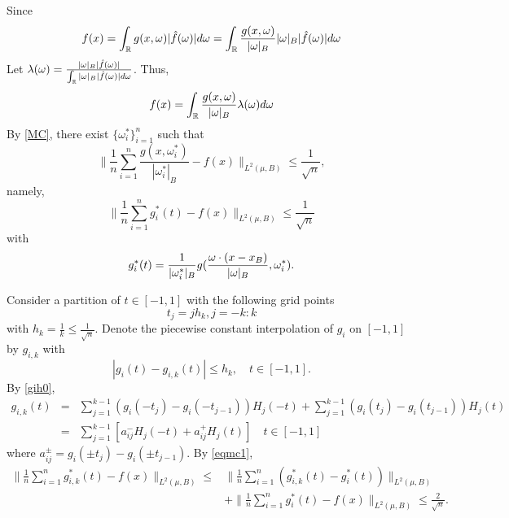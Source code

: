 
Since 
$$
f(x)=\int_{\mathbb R} g(x,\omega)|\hat f(\omega)|d\omega = \int_{\mathbb R} {g(x,\omega)\over |\omega|_B} |\omega|_B|\hat f(\omega)|d\omega
$$
Let $\lambda(\omega) = {|\omega|_B|\hat f(\omega)|\over \int_{\mathbb R} |\omega|_B|\hat f(\omega)|d\omega}$. Thus,
$$
f(x)=\int_{\mathbb R} {g(x,\omega)\over |\omega|_B}\lambda(\omega)d\omega
$$
By \eqref{MC}, there exist $\{\omega_i^\ast\}_{i=1}^n$ such that
$$
	\|\frac1n \sum_{i=1}^n \frac{g(x,\omega_i^\ast)}{|\omega_i^\ast|_B}-f(x)\|_{L^2(\mu,B)}\le \frac{1}{\sqrt{n}},
$$
namely,
\begin{equation}\label{eqmc1}
	\|\frac1n \sum_{i=1}^n g_i^\ast (t)-f(x)\|_{L^2(\mu,B)}\le \frac{1}{\sqrt{n}}
\end{equation}
with 
$$\displaystyle g_i^\ast (t)=\frac{1}{|\omega_i^\ast |_B}g({\omega\cdot (x-x_B)\over |\omega|_B},\omega_i^\ast).
$$


Consider a partition of $t\in [-1,1]$ with the following grid points
$$
t_j=jh_k, j=-k:k
$$
with 
$
h_k=\frac{1}{k}\le \frac{1}{\sqrt{n}}.
$
Denote the piecewise constant interpolation of $g_i$ on $[-1,1]$ by $g_{i,k}$ with
\begin{equation}\label{pro:intererror}
	|g_i(t)-g_{i,k}(t)|\le h_k, \quad t\in [-1,1].
\end{equation} 
By \eqref{gih0},
\begin{eqnarray}
	g_{i,k}(t)&=&
	\sum_{j=1}^{k-1}(g_i(-t_j) - g_i(-t_{j-1}))H_j(-t)+\sum_{j=1}^{k-1}(g_i(t_j) - g_i(t_{j-1})) H_{j}(t)\nonumber \\ 
	&=&\sum_{j=1}^{k-1}[a_{ij}^-H_j(-t)+a_{ij}^+H_{j}(t)] \label{gih}
	\quad t\in [-1,1]
\end{eqnarray}
where 
$
a_{ij}^{\pm}=g_i(\pm t_j) - g_i(\pm t_{j-1}).
$ 
By \eqref{eqmc1},
\begin{equation} \label{eq:gast}
\begin{split}
	\|\frac1n  \sum_{i=1}^n g_{i,k}^\ast(t)-f(x)\|_{L^2(\mu,B)}\le &
	\|\frac1n  \sum_{i=1}^n (g_{i,k}^\ast(t)-g_i^\ast(t))\|_{L^2(\mu,B)} \\
	&+ \|\frac1n  \sum_{i=1}^n g_{i}^\ast(t)-f(x)\|_{L^2(\mu,B)}\le
	\frac{2}{\sqrt{n}}.
\end{split}
\end{equation}


